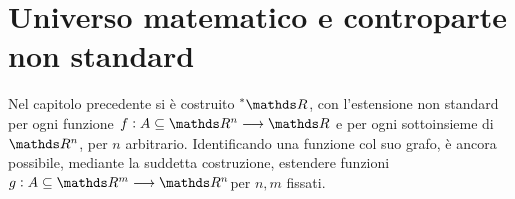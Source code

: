 \chapter{Universo matematico e controparte non standard}






Nel capitolo precedente si è costruito $ \starR $, con l'estensione non standard per ogni funzione $ f: A \subseteq \R^{n} \longrightarrow \R $ e per ogni sottoinsieme di $ \R^{n} $, per $ n $ arbitrario. Identificando una funzione col suo grafo, è ancora possibile, mediante la suddetta costruzione, estendere funzioni $ g: A \subseteq \R^{m} \longrightarrow \R^{n}$per $ n, m $ fissati.

